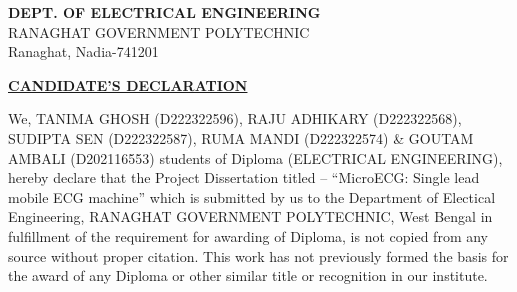 \documentclass[12pt,a4paper]{report}
\begin{document}
\begin{center}


\begin{center}
\textbf{DEPT. OF ELECTRICAL ENGINEERING}\\

RANAGHAT GOVERNMENT POLYTECHNIC \\

Ranaghat, Nadia-741201\\
\end{center}
\vspace{2 cm}
\textbf{\underline{CANDIDATE’S DECLARATION}}\\
\end{center}
\vspace{1.2cm}
We, TANIMA GHOSH (D222322596), RAJU ADHIKARY (D222322568), SUDIPTA SEN (D222322587), RUMA MANDI (D222322574) \& GOUTAM AMBALI (D202116553) students of Diploma (ELECTRICAL ENGINEERING), hereby declare that the Project Dissertation titled -- “MicroECG: Single lead mobile ECG machine” which is submitted by us to the Department of Electical Engineering, RANAGHAT GOVERNMENT POLYTECHNIC, West Bengal in fulfillment of the requirement for awarding of Diploma, is not copied from any source without proper citation. This work has not previously formed the basis for the award of any Diploma or other similar title or recognition in our institute.
\end{document}
